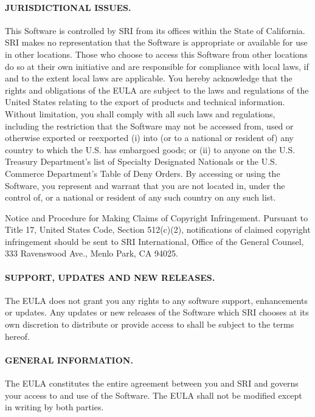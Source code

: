 \documentclass[11pt,twoside,fleqn,openright,titlepage]{cslreport}
\begin{document}
\begin{small}
\paragraph{JURISDICTIONAL ISSUES.}   This Software is  controlled by
SRI from  its offices within  the State  of California.  SRI  makes no
representation that the  Software is appropriate or  available for use
in other  locations.  Those  who choose to  access this  Software from
other locations do so at their  own initiative and are responsible for
compliance  with local  laws,  if and  to the  extent  local laws  are
applicable.  You hereby acknowledge that the rights and obligations of
the EULA are subject to the  laws and regulations of the United States
relating to the export of products and technical information.  Without
limitation,  you shall  comply  with all  such  laws and  regulations,
including the restriction that the  Software may not be accessed from,
used or otherwise exported or reexported (i) into (or to a national or
resident of)  any country to  which the  U.S. has embargoed  goods; or
(ii) to  anyone on  the U.S. Treasury  Department's list  of Specialty
Designated Nationals or  the U.S. Commerce Department's  Table of Deny
Orders.  By accessing or using the Software, you represent and warrant
that you are  not located in, under  the control of, or  a national or
resident of any such country on any such list.

Notice  and Procedure  for  Making Claims  of Copyright  Infringement.
Pursuant  to   Title  17,  United  States   Code,  Section  512(c)(2),
notifications of claimed copyright  infringement should be sent to SRI
International,  Office of  the General  Counsel, 333  Ravenswood Ave.,
Menlo Park, CA 94025.

\paragraph{SUPPORT, UPDATES  AND NEW RELEASES.}  The  EULA does not  grant
you any rights to any  software support, enhancements or updates.  Any
updates or new  releases of the Software which SRI  chooses at its own
discretion to distribute or provide access  to shall be subject to the
terms hereof.

\paragraph{GENERAL  INFORMATION.}   The  EULA  constitutes  the  entire
agreement between  you and SRI and  governs your access to  and use of
the Software.   The EULA shall  not be  modified except in  writing by
both parties.


\end{small}
\end{document}
